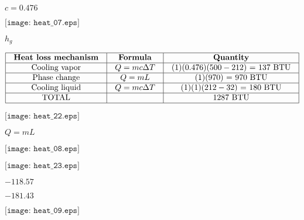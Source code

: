 \documentclass[12pt,a4paper,margin=2cm]{book}
\def\lthtmlcheckvsize{\ifdim\ht\sizebox<\vsize 
  \ifdim\wd\sizebox<\hsize\expandafter\hfill\fi \expandafter\vfill
  \else\expandafter\vss\fi}%
\begin{document}
{\newpage\clearpage
{}%
$ c = 0.476$%
\lthtmlindisplaymathZ
\lthtmlcheckvsize\clearpage}

{\newpage\clearpage
{}%
$\displaystyle \texttt{[image: heat\_07.eps]}$%
\lthtmlindisplaymathZ
\lthtmlcheckvsize\clearpage}

{\newpage\clearpage
{}%
$ h_g$%
\lthtmlindisplaymathZ
\lthtmlcheckvsize\clearpage}

{\newpage\clearpage
{}%
$\displaystyle \vbox{\offinterlineskip
\halign{\strut
\vrule \quad\hfil # \  \hfil & 
\vrule \quad\hfil # \  \hfil & 
\vrule \quad\hfil # \  \hfil \vrule \cr
\noalign{\hrule }
\textbf{Heat loss mechanism} & \textbf{Formula} & \textbf{Quantity} \cr
\noalign{\hrule }
Cooling vapor & $Q = mc \Delta T$ & (1)(0.476)($500-212$) = 137 BTU \cr
\noalign{\hrule }
Phase change & $Q = mL$ & (1)(970) = 970 BTU \cr
\noalign{\hrule }
Cooling liquid & $Q = mc \Delta T$ & (1)(1)($212-32$) = 180 BTU \cr
\noalign{\hrule }
TOTAL &  & 1287 BTU \cr
\noalign{\hrule }
} %
}$%
\lthtmlindisplaymathZ
\lthtmlcheckvsize\clearpage}

{\newpage\clearpage
{}%
$\displaystyle \texttt{[image: heat\_22.eps]}$%
\lthtmlindisplaymathZ
\lthtmlcheckvsize\clearpage}

{\newpage\clearpage
{}%
$ Q = mL$%
\lthtmlindisplaymathZ
\lthtmlcheckvsize\clearpage}

{\newpage\clearpage
{}%
$\displaystyle \texttt{[image: heat\_08.eps]}$%
\lthtmlindisplaymathZ
\lthtmlcheckvsize\clearpage}

{\newpage\clearpage
{}%
$\displaystyle \texttt{[image: heat\_23.eps]}$%
\lthtmlindisplaymathZ
\lthtmlcheckvsize\clearpage}

{\newpage\clearpage
{}%
$ -118.57$%
\lthtmlindisplaymathZ
\lthtmlcheckvsize\clearpage}

{\newpage\clearpage
{}%
$ -181.43$%
\lthtmlindisplaymathZ
\lthtmlcheckvsize\clearpage}

{\newpage\clearpage
{}%
$\displaystyle \texttt{[image: heat\_09.eps]}$%
\lthtmlindisplaymathZ
\lthtmlcheckvsize\clearpage}
\end{document}
